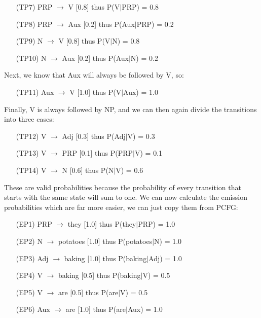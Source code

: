 \documentclass[twoside]{homework}
\begin{document}
\begin{itemize}
\begin{itemize}
        \begin{itemize}
            \item [(TP7)] PRP $\xrightarrow{}$ V [0.8] thus P(V$|$PRP) = 0.8
            \item [(TP8)] PRP $\xrightarrow{}$ Aux [0.2] thus P(Aux$|$PRP) = 0.2
            \item [(TP9)] N $\xrightarrow{}$ V [0.8] thus P(V$|$N) = 0.8
            \item [(TP10)] N $\xrightarrow{}$ Aux [0.2] thus P(Aux$|$N) = 0.2
        \end{itemize}
        Next, we know that Aux will always be followed by V, so:
        \begin{itemize}
            \item [(TP11)] Aux $\xrightarrow{}$ V [1.0] thus P(V$|$Aux) = 1.0
        \end{itemize}
        Finally, V is always followed by NP, and we can then again divide the transitions into three cases:
        \begin{itemize}
            \item [(TP12)] V $\xrightarrow{}$ Adj [0.3] thus P(Adj$|$V) = 0.3
            \item [(TP13)] V $\xrightarrow{}$ PRP [0.1] thus P(PRP$|$V) = 0.1
            \item [(TP14)] V $\xrightarrow{}$ N [0.6] thus P(N$|$V) = 0.6
        \end{itemize}
    \end{itemize}
    These are valid probabilities because the probability of every transition that starts with the same state will sum to one. We can now calculate the emission probabilities which are far more easier, we can just copy them from PCFG:
    \begin{itemize}
        \item [(EP1)] PRP $\xrightarrow{}$ they [1.0] thus P(they$|$PRP) = 1.0
        \item [(EP2)] N $\xrightarrow{}$ potatoes [1.0] thus P(potatoes$|$N) = 1.0
        \item [(EP3)] Adj $\xrightarrow{}$ baking [1.0] thus P(baking$|$Adj) = 1.0
        \item [(EP4)] V $\xrightarrow{}$ baking [0.5] thus P(baking$|$V) = 0.5
        \item [(EP5)] V $\xrightarrow{}$ are [0.5] thus P(are$|$V) = 0.5
        \item [(EP6)] Aux $\xrightarrow{}$ are [1.0] thus P(are$|$Aux) = 1.0
    \end{itemize}

\end{itemize}
\end{document}
